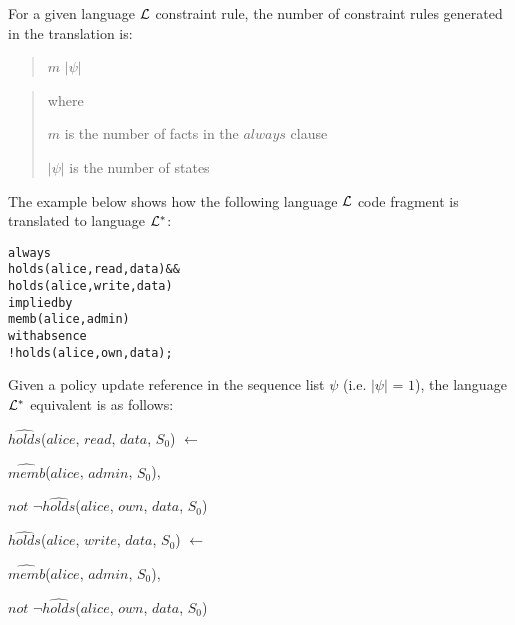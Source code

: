 \documentclass[glov2,twocolumn,final]{svjour2}
\newenvironment{vquote}
  {\begin{list}{}{\leftmargin 1em}\item[]}
  {\end{list}}
\newenvironment{vverbatim}
  {\begin{alltt}}
  {\vspace{-\baselineskip}\end{alltt}}
\begin{document}
          For a given language ${\cal L}$ constraint rule, the number of
          constraint rules generated in the translation is:

          \begin{quote}
            $m$ $|\psi|$
          \end{quote}

          \begin{quote}
            where

            $m$ is the number of facts in the $always$ clause

            $|\psi|$ is the number of states
          \end{quote}

          The example below shows how the following language ${\cal L}$ code
          fragment is translated to language ${\cal L}^{*}$:

          \begin{vverbatim}
  always
    holds(alice, read, data) &&
    holds(alice, write, data)
  implied by
    memb(alice, admin)
  with absence
    !holds(alice, own, data);
          \end{vverbatim}

          Given a policy update reference in the sequence list $\psi$ (i.e.
          $|\psi|$ = $1$), the language ${\cal L}^{*}$ equivalent is as
          follows:

          \begin{vquote}
            $\hat{holds}$($alice$, $read$, $data$, $S_{0}$) $\leftarrow$

            \hspace{1em}
            $\hat{memb}$($alice$, $admin$, $S_{0}$),

            \hspace{1em}
            $not$ $\lnot\hat{holds}$($alice$, $own$, $data$, $S_{0}$)

            $\hat{holds}$($alice$, $write$, $data$, $S_{0}$) $\leftarrow$

            \hspace{1em}
            $\hat{memb}$($alice$, $admin$, $S_{0}$),

            \hspace{1em}
            $not$ $\lnot\hat{holds}$($alice$, $own$, $data$, $S_{0}$)
          \end{vquote}
\end{document}
